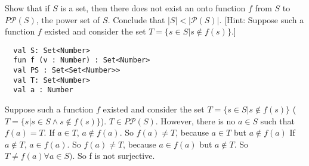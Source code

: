 \documentclass[english]{article}
\begin{document}
Show that if $S$ is a set, then there does not exist an onto function $f$ from $S$ to $P\mathcal P(S)$, the power set of $S$. Conclude
that $|S| < |\mathcal P(S)|$. [Hint: Suppose such a function $f$ existed and consider the set $T = \{s \in S | s  \notin f (s) \}$.]

\begin{lstlisting}
  val S: Set<Number>
  fun f (v : Number) : Set<Number>
  val PS : Set<Set<Number>>
  val T: Set<Number>
  val a : Number
\end{lstlisting}

Suppose such a function $f$ existed and consider the set $T = \{s \in S | s  \notin f (s) \}$ ($T = \{s | s \in S \land s \notin f(s)\}$). $T \in P\mathcal P(S)$. However, there is no $a \in S$ such that $f(a) = T$.
If $a \in T$, $a \notin f(a)$. So $f(a) \neq T$, because $a \in T$ but $a \notin f(a)$
If $a \notin T$, $a \in f(a)$. So $f(a) \neq T$, because $a \in f(a)$ but $a \notin T$.
So $T \neq f(a) \forall a \in S)$. So f is not surjective.  
\end{document}
